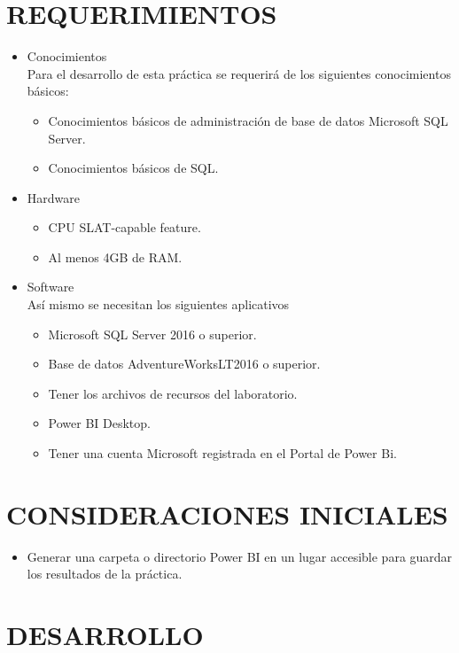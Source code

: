 \documentclass[12pt,letterpaper]{article}
\begin{document}
    \section{REQUERIMIENTOS}
    \begin{itemize}
        \item Conocimientos\\
        Para el desarrollo de esta práctica se requerirá de los siguientes conocimientos básicos:
        \begin{itemize} 
            \item Conocimientos básicos de administración de base de datos Microsoft SQL Server.
            \item Conocimientos básicos de SQL.
        \end{itemize}
        \item Hardware
        \begin{itemize}
            \item CPU SLAT-capable feature.
            \item Al menos 4GB de RAM.
        \end{itemize}
        \item Software\\
        Así mismo se necesitan los siguientes aplicativos
        \begin{itemize}
            \item Microsoft SQL Server 2016 o superior.
            \item Base de datos AdventureWorksLT2016 o superior.
            \item Tener los archivos de recursos del laboratorio.
            \item Power BI Desktop.
            \item Tener una cuenta Microsoft registrada en el Portal de Power Bi.
        \end{itemize}
    \end{itemize}
    
    \section{CONSIDERACIONES INICIALES}
    \begin{itemize}
        \item Generar una carpeta o directorio Power BI en un lugar accesible para guardar los resultados de la práctica.
    \end{itemize}
    
    \newpage
    \section{DESARROLLO}
    
\end{document}
